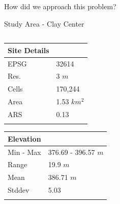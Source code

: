 \documentclass[
  ignorenonframetext,
]{beamer}
\begin{document}
\begin{frame}[fragile]{How did we approach this problem?}
\begin{block}{Study Area - Clay Center}
\begin{columns}[T]
\begin{column}{0.5\textwidth}
\begin{longtable}[]{@{}ll@{}}
\toprule\noalign{}
Site Details & \\
\midrule\noalign{}
\endhead
EPSG & 32614 \\
Res. & 3 \(m\) \\
Cells & 170,244 \\
Area & 1.53 \(km^2\) \\
ARS & 0.13 \\
\bottomrule\noalign{}
\end{longtable}

\begin{longtable}[]{@{}ll@{}}
\toprule\noalign{}
Elevation & \\
\midrule\noalign{}
\endhead
Min - Max & 376.69 - 396.57 \(m\) \\
Range & 19.9 \(m\) \\
Mean & 386.71 \(m\) \\
Stddev & 5.03 \\
\bottomrule\noalign{}
\end{longtable}
\end{column}
\end{columns}
\end{block}


\end{frame}
\end{document}
